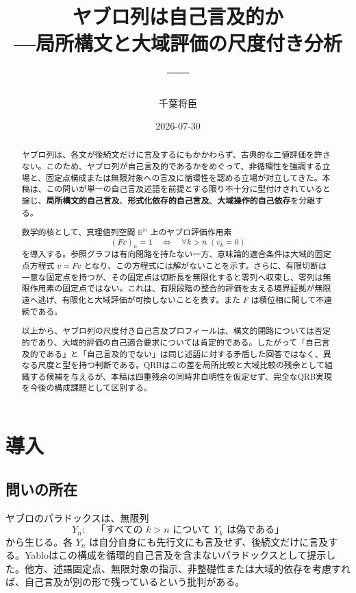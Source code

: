 \documentclass[a4paper,11pt]{ltjsarticle}
\title{ヤブロ列は自己言及的か\\
{\large ---局所構文と大域評価の尺度付き分析---}}
\author{千葉将臣}
\date{2026-07-30}
\theoremstyle{definition}
\theoremstyle{plain}
\newcommand{\Bool}{\mathbb B}
\newcommand{\N}{\mathbb N}
\begin{document}
\maketitle

\begin{abstract}
ヤブロ列は、各文が後続文だけに言及するにもかかわらず、古典的な二値評価を許さない。このため、ヤブロ列が自己言及的であるかをめぐって、非循環性を強調する立場と、固定点構成または無限対象への言及に循環性を認める立場が対立してきた。本稿は、この問いが単一の自己言及述語を前提とする限り不十分に型付けされていると論じ、\textbf{局所構文的自己言及}、\textbf{形式化依存的自己言及}、\textbf{大域操作的自己依存}を分離する。

数学的核として、真理値列空間 $\Bool^{\N}$ 上のヤブロ評価作用素
\[
 (Fv)_n=1
 \quad\Longleftrightarrow\quad
 \forall k>n\;(v_k=0)
\]
を導入する。参照グラフは有向閉路を持たない一方、意味論的適合条件は大域的固定点方程式 $v=Fv$ となり、この方程式には解がないことを示す。さらに、有限切断は一意な固定点を持つが、その固定点は切断長を無限化すると零列へ収束し、零列は無限作用素の固定点ではない。これは、有限段階の整合的評価を支える境界証拠が無限遠へ逃げ、有限化と大域評価が可換しないことを表す。また $F$ は積位相に関して不連続である。

以上から、ヤブロ列の尺度付き自己言及プロフィールは、構文的閉路については否定的であり、大域的評価の自己適合要求については肯定的である。したがって「自己言及的である」と「自己言及的でない」は同じ述語に対する矛盾した回答ではなく、異なる尺度と型を持つ判断である。QRBはこの差を局所比較と大域比較の残余として組織する候補を与えるが、本稿は四重残余の同時非自明性を仮定せず、完全なQRB実現を今後の構成課題として区別する。
\end{abstract}

\tableofcontents

\section{導入}

\subsection{問いの所在}

ヤブロのパラドックスは、無限列
\begin{equation}
 Y_n:\quad
 \text{「すべての }k>n\text{ について }Y_k\text{ は偽である」}
 \label{eq:yablo-sentence}
\end{equation}
から生じる。各 $Y_n$ は自分自身にも先行文にも言及せず、後続文だけに言及する。Yabloはこの構成を循環的自己言及を含まないパラドックスとして提示した\cite{Yablo1993}。他方、述語固定点、無限対象の指示、非整礎性または大域的依存を考慮すれば、自己言及が別の形で残っているという批判がある\cite{Priest1997Yablo,Beall2001Yablo,Leitgeb2002Yablo,BuenoColyvan2003Yablo,Cook2014Yablo}。
\end{document}
